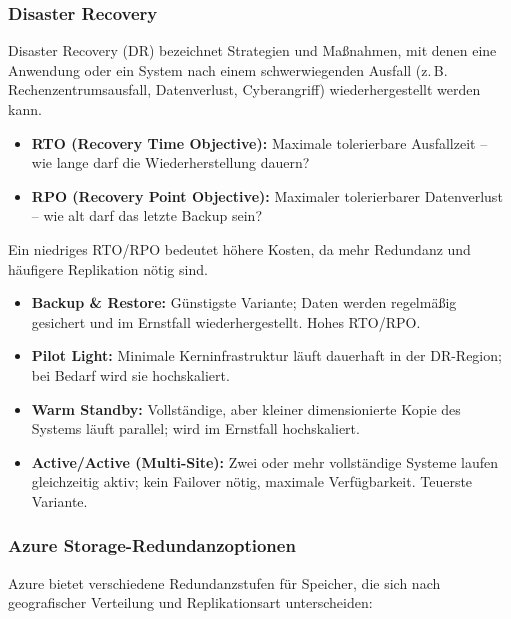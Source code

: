 \subsubsection{Disaster Recovery}
Disaster Recovery (DR) bezeichnet Strategien und Maßnahmen, mit denen eine Anwendung oder ein System nach einem schwerwiegenden Ausfall (z.\,B. Rechenzentrumsausfall, Datenverlust, Cyberangriff) wiederhergestellt werden kann.

\begin{itemize}
    \item \textbf{RTO (Recovery Time Objective):} Maximale tolerierbare Ausfallzeit -- wie lange darf die Wiederherstellung dauern?
    \item \textbf{RPO (Recovery Point Objective):} Maximaler tolerierbarer Datenverlust -- wie alt darf das letzte Backup sein?
\end{itemize}
Ein niedriges RTO/RPO bedeutet höhere Kosten, da mehr Redundanz und häufigere Replikation nötig sind.

\begin{itemize}
    \item \textbf{Backup \& Restore:} Günstigste Variante; Daten werden regelmäßig gesichert und im Ernstfall wiederhergestellt. Hohes RTO/RPO.
    \item \textbf{Pilot Light:} Minimale Kerninfrastruktur läuft dauerhaft in der DR-Region; bei Bedarf wird sie hochskaliert.
    \item \textbf{Warm Standby:} Vollständige, aber kleiner dimensionierte Kopie des Systems läuft parallel; wird im Ernstfall hochskaliert.
    \item \textbf{Active/Active (Multi-Site):} Zwei oder mehr vollständige Systeme laufen gleichzeitig aktiv; kein Failover nötig, maximale Verfügbarkeit. Teuerste Variante.
\end{itemize}

\subsubsection*{Azure Storage-Redundanzoptionen}
Azure bietet verschiedene Redundanzstufen für Speicher, die sich nach geografischer Verteilung und Replikationsart unterscheiden:

